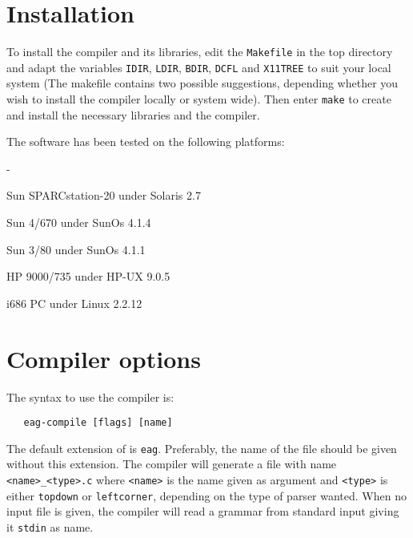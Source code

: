 \section{Installation}
To install the \EAG compiler and its libraries, edit the {\tt Makefile}
in the top directory and adapt the variables {\tt IDIR}, {\tt LDIR},
{\tt BDIR}, {\tt DCFL} and {\tt X11TREE} to suit your local system
(The makefile contains two possible suggestions, depending whether you
wish to install the compiler locally or system wide). Then enter
{\tt make} to create and install the necessary libraries and the
compiler.

The software has been tested on the following platforms:
\begin {list}{-}{}
\item Sun SPARCstation-20 under Solaris 2.7
\item Sun 4/670 under SunOs 4.1.4
\item Sun 3/80 under SunOs 4.1.1
\item HP 9000/735 under HP-UX 9.0.5
\item i686 PC under Linux 2.2.12
\end {list}
\section{Compiler options}
The syntax to use the compiler is:
\begin{verbatim}
   eag-compile [flags] [name]
\end{verbatim}
The default extension of \EAG is {\tt eag}. Preferably, the name
of the file should be given without this extension. The compiler will
generate a \C file with name \verb+<name>_<type>.c+ where
\verb+<name>+ is the name given as argument and
\verb+<type>+ is either {\tt topdown} or {\tt leftcorner},
depending on the type of parser wanted.
When no input file is given, the compiler will read a grammar from
standard input giving it {\tt stdin} as name.

